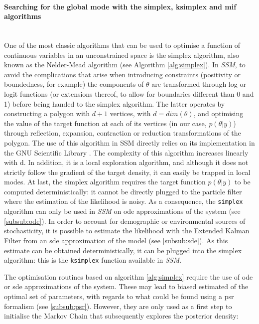 \documentclass[a4paper,11pt,titlepage]{article}
\theoremstyle{plain} %
\begin{document}
\paragraph{Searching for the global mode with the simplex, ksimplex and mif algorithms}\mbox{}\\
One of the most classic algorithms that can be used to optimise a function of continuous variables in an unconstrained space is the simplex algorithm, also known as the  Nelder-Mead algorithm (see Algorithm \ref{alg:simplex}). In \emph{SSM}, to avoid the complications that arise when introducing constraints (positivity or boundedness, for example) the components of $\theta$ are transformed through log or logit functions (or extensions thereof, to allow for boundaries different than 0 and 1) before being handed to the simplex algorithm. The latter operates by constructing a polygon with $d+1$ vertices, with $d=dim(\theta)$, and optimising the value of the target function at each of its vertices (in our case, $p(\theta|y)$) through reflection, expansion, contraction or reduction transformations of the polygon. The use of this algorithm in SSM directly relies on its implementation in the GNU Scientific Library \citep{Galassi2006}. The complexity of this algorithm increases linearly with d. In addition, it is a local exploration algorithm, and although it does not strictly follow the gradient of the target density, it can easily be trapped in local modes. At last, the simplex algorithm requires the target function $p(\theta|y)$ to be computed deterministically: it cannot be directly plugged to the particle filter where the estimation of the likelihood is noisy. As a consequence, the \texttt{simplex} algorithm can only be used in \emph{SSM} on ode approximations of the system (see \ref{subsub:ode}). In order to account for demographic or environmental sources of stochasticity, it is possible to estimate the likelihood with the Extended Kalman Filter from an sde approximation of the model (see \ref{subsub:sde}). As this estimate can be obtained deterministically, it can be plugged into the simplex algorithm: this is the \texttt{ksimplex} function available in  \emph{SSM}.


The optimisation routines based on algorithm \ref{alg:simplex} require the use of ode or sde approximations of the system. These may lead to biased estimated of the optimal set of parameters, with regards to what could be found using a psr formalism (see \ref{subsub:psr}). However, they are only used as a first step to initialise the Markov Chain that subsequently explores the posterior density:
\end{document}
